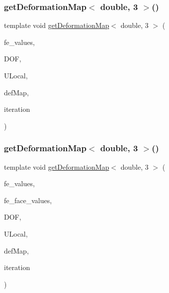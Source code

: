 \mbox{\label{function_evaluations_8cc_a9d25cc478ac60031a64a48a1687fabc2}} 
\subsubsection{\texorpdfstring{getDeformationMap$<$ double, 3 $>$()}{getDeformationMap< double, 3 >()}\hspace{0.1cm}{\footnotesize\ttfamily [1/2]}}
{\footnotesize\ttfamily template void \mbox{\hyperlink{group___evaluation_functions_ga239b206235603af9482484c29c8d57ea}{get\+Deformation\+Map}}$<$ double, 3 $>$ (\begin{DoxyParamCaption}\item[{const F\+E\+Values$<$ 3 $>$ \&}]{fe\+\_\+values,  }\item[{unsigned int}]{D\+OF,  }\item[{Table$<$ 1, double $>$ \&}]{U\+Local,  }\item[{\mbox{\hyperlink{structdeformation_map}{deformation\+Map}}$<$ double, 3 $>$ \&}]{def\+Map,  }\item[{unsigned int}]{iteration }\end{DoxyParamCaption})}

\mbox{\label{function_evaluations_8cc_a7c7b5895783c8ab03bd49b2d099a8d36}} 
\subsubsection{\texorpdfstring{getDeformationMap$<$ double, 3 $>$()}{getDeformationMap< double, 3 >()}\hspace{0.1cm}{\footnotesize\ttfamily [2/2]}}
{\footnotesize\ttfamily template void \mbox{\hyperlink{group___evaluation_functions_ga239b206235603af9482484c29c8d57ea}{get\+Deformation\+Map}}$<$ double, 3 $>$ (\begin{DoxyParamCaption}\item[{const F\+E\+Values$<$ 3 $>$ \&}]{fe\+\_\+values,  }\item[{const F\+E\+Face\+Values$<$ 3 $>$ \&}]{fe\+\_\+face\+\_\+values,  }\item[{unsigned int}]{D\+OF,  }\item[{Table$<$ 1, double $>$ \&}]{U\+Local,  }\item[{\mbox{\hyperlink{structdeformation_map}{deformation\+Map}}$<$ double, 3 $>$ \&}]{def\+Map,  }\item[{unsigned int}]{iteration }\end{DoxyParamCaption})}

